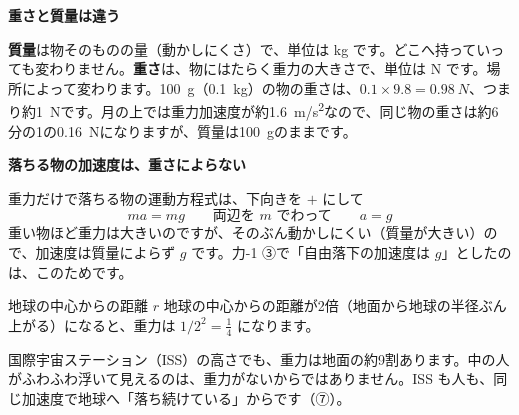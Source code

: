 \noindent\textbf{重さと質量は違う}\par
\noindent \textbf{質量}は物そのものの量（動かしにくさ）で、単位は kg です。どこへ持っていっても変わりません。\textbf{重さ}は、物にはたらく重力の大きさで、単位は N です。場所によって変わります。\qty{100}{g}（\qty{0.1}{kg}）の物の重さは、$0.1\times9.8=\qty{0.98}{N}$、つまり約\qty{1}{N}です。月の上では重力加速度が約\qty{1.6}{m/s^2}なので、同じ物の重さは約6分の1の\qty{0.16}{N}になりますが、質量は\qty{100}{g}のままです。

\noindent\textbf{落ちる物の加速度は、重さによらない}\par
\noindent\label{ph:力-2:rakka}重力だけで落ちる物の運動方程式は、下向きを $+$ にして
\[ ma=mg\qquad\text{両辺を } m \text{ でわって}\qquad a=g \]
重い物ほど重力は大きいのですが、そのぶん動かしにくい（質量が大きい）ので、加速度は質量によらず $g$ です。力-1 ③で「自由落下の加速度は $g$」としたのは、このためです。

\begin{lrbox}{\pxcplota}\end{lrbox}%
\begin{phbaisuru}{地球の中心からの距離 $r$}
地球の中心からの距離が2倍（地面から地球の半径ぶん上がる）になると、重力は $1/2^2=\tfrac{1}{4}$ になります。
\begin{bkcenter}
\usebox{\pxcplota}
\end{bkcenter}
国際宇宙ステーション（ISS）の高さでも、重力は地面の約9割あります。中の人がふわふわ浮いて見えるのは、重力がないからではありません。ISS も人も、同じ加速度で地球へ「落ち続けている」からです（⑦）。
\end{phbaisuru}

\begin{phflow}[重力]
\end{phflow}

